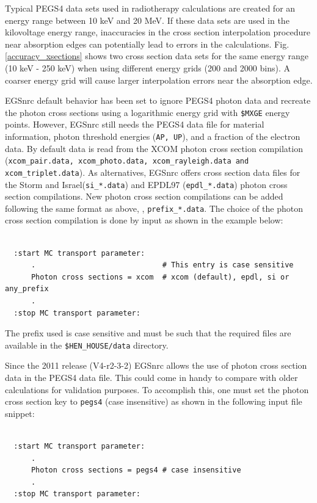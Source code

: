 Typical PEGS4 data sets used in radiotherapy
calculations are created for an energy range between 10 keV and 20 MeV.
If these data sets are used in the kilovoltage energy
range, inaccuracies in the cross section interpolation procedure near
absorption edges can potentially lead to errors in the calculations.
Fig. \ref{accuracy_xsections} shows two cross section data sets
for the same energy range (10 keV - 250 keV) when using
different energy grids (200 and 2000 bins). A coarser energy
grid will cause larger interpolation errors near the absorption edge.

EGSnrc default behavior has been set to ignore PEGS4 photon
data and recreate the photon cross sections using a logarithmic energy
grid with {\tt \$MXGE} energy points. However, EGSnrc still needs the
PEGS4 data file for material information, photon threshold energies
({\tt AP, UP}), and a fraction of the electron data.
By default data is read from the XCOM\cite{HS95} photon cross section
compilation ({\tt xcom\_pair.data, xcom\_photo.data, xcom\_rayleigh.data and
xcom\_triplet.data}). As alternatives, EGSnrc offers cross section data files
for the Storm and Israel\cite{SI70}({\tt si\_*.data}) and EPDL97\cite{Cu89}
({\tt epdl\_*.data}) photon cross section compilations.
New photon cross section compilations can be added following the
same format as above, \ie, {\tt prefix\_*.data}.
The choice of the photon cross section
compilation is done by input as shown in the example below:
\begin{verbatim}

  :start MC transport parameter:
      .                             # This entry is case sensitive
      Photon cross sections = xcom  # xcom (default), epdl, si or any_prefix
      .
  :stop MC transport parameter:

\end{verbatim}
The prefix used is case sensitive and must be such that the required files
are available in the {\tt \$HEN\_HOUSE/data} directory.

Since the 2011 release (V4-r2-3-2) EGSnrc allows the
use of photon cross section data in the PEGS4 data file. This could
come in handy to compare with older calculations for validation
purposes. To accomplish this, one must set the photon cross section key to
{\tt pegs4} (case insensitive) as shown in the following input file snippet:
\begin{verbatim}

  :start MC transport parameter:
      .
      Photon cross sections = pegs4 # case insensitive
      .
  :stop MC transport parameter:

\end{verbatim}
